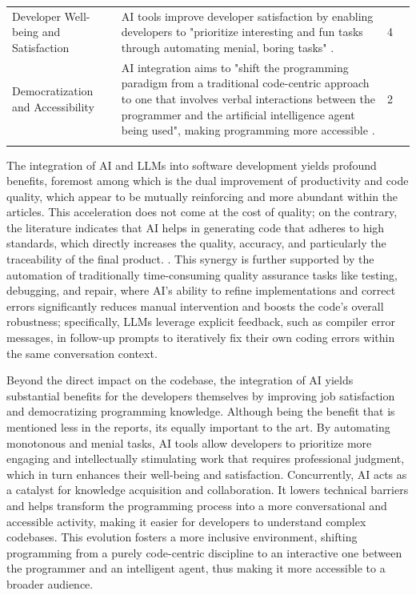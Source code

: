 {\begin{longtable}{>{\raggedright\arraybackslash} p{3cm} p{9.3cm} p{0.2cm} p{1.8cm}}
Developer Well-being and Satisfaction & AI tools improve developer satisfaction by enabling developers to "prioritize interesting and fun tasks through automating menial, boring tasks" \cite{Jensen:2025me}. & 4 & \cite{Jensen:2025me, Zhang:2025ea, Basha:2025tt, Qiu:2025ft} \\ \addlinespace

Democratization and Accessibility & AI integration aims to "shift the programming paradigm from a traditional code-centric approach to one that involves verbal interactions between the programmer and the artificial intelligence agent being used", making programming more accessible \cite{Zamfiroiu:2025ec}. & 2 & \cite{Zamfiroiu:2025ec, Moore:2025vc} \\ \addlinespace

\end{longtable}
}


The integration of AI and LLMs into software development yields profound benefits, foremost among which is the dual improvement of productivity and code quality, which appear to be mutually reinforcing and more abundant within the articles. This acceleration does not come at the cost of quality; on the contrary, the literature indicates that AI helps in generating code that adheres to high standards, which directly increases the quality, accuracy, and particularly the traceability of the final product. \cite{Kim:2025is}. This synergy is further supported by the automation of traditionally time-consuming quality assurance tasks like testing, debugging, and repair, where AI's ability to refine implementations and correct errors significantly reduces manual intervention and boosts the code's overall robustness; specifically, LLMs leverage explicit feedback, such as compiler error messages, in follow-up prompts to iteratively fix their own coding errors within the same conversation context. 

Beyond the direct impact on the codebase, the integration of AI yields substantial benefits for the developers themselves by improving job satisfaction and democratizing programming knowledge. Although being the benefit that is mentioned less in the reports, its equally important to the art. By automating monotonous and menial tasks, AI tools allow developers to prioritize more engaging and intellectually stimulating work that requires professional judgment, which in turn enhances their well-being and satisfaction. Concurrently, AI acts as a catalyst for knowledge acquisition and collaboration. It lowers technical barriers and helps transform the programming process into a more conversational and accessible activity, making it easier for developers to understand complex codebases. This evolution fosters a more inclusive environment, shifting programming from a purely code-centric discipline to an interactive one between the programmer and an intelligent agent, thus making it more accessible to a broader audience.

